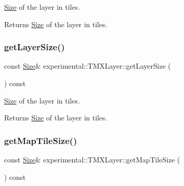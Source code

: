 \hyperlink{classSize}{Size} of the layer in tiles.

\begin{DoxyReturn}{Returns}
\hyperlink{classSize}{Size} of the layer in tiles. 
\end{DoxyReturn}
\mbox{\label{classexperimental_1_1TMXLayer_a052a2a0dce9610b40cf6b7323bdcef5b}} 
\subsubsection{\texorpdfstring{get\+Layer\+Size()}{getLayerSize()}\hspace{0.1cm}{\footnotesize\ttfamily [2/2]}}
{\footnotesize\ttfamily const \hyperlink{classSize}{Size}\& experimental\+::\+T\+M\+X\+Layer\+::get\+Layer\+Size (\begin{DoxyParamCaption}{ }\end{DoxyParamCaption}) const\hspace{0.3cm}{\ttfamily [inline]}}

\hyperlink{classSize}{Size} of the layer in tiles.

\begin{DoxyReturn}{Returns}
\hyperlink{classSize}{Size} of the layer in tiles. 
\end{DoxyReturn}
\mbox{\label{classexperimental_1_1TMXLayer_a04180a8f4d7d96790212aabc959339de}} 
\subsubsection{\texorpdfstring{get\+Map\+Tile\+Size()}{getMapTileSize()}\hspace{0.1cm}{\footnotesize\ttfamily [1/2]}}
{\footnotesize\ttfamily const \hyperlink{classSize}{Size}\& experimental\+::\+T\+M\+X\+Layer\+::get\+Map\+Tile\+Size (\begin{DoxyParamCaption}{ }\end{DoxyParamCaption}) const\hspace{0.3cm}{\ttfamily [inline]}}

